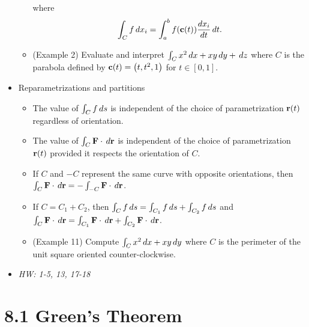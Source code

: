 \documentclass[11pt]{article}
\begin{document}
\begin{itemize}
\begin{itemize}
\[            \]
            where
            \[
              \int_C f\,d x_i
                =
              \int_a^b f(\mathbf{c}(t))\frac{dx_i}{dt}\,d t
            .\]
      \item (Example 2) Evaluate and interpret
            \(\int_C x^2\,d x+xy\,d y+\,d z\) where \(C\) is the
            parabola defined
            by \(\mathbf{c}(t)=\left(t,t^2,1\right)\) for \(t\in[0,1]\).
    \end{itemize}
  \item Reparametrizations and partitions
    \begin{itemize}
      \item The value of \(\int_C f\,d s\)
            is independent of the choice of parametrization \(\mathbf{r}(t)\)
            regardless of orientation.
      \item The value of \(\int_C \mathbf{F}\cdot\,d \mathbf{r}\)
            is independent of the choice of parametrization \(\mathbf{r}(t)\)
            provided it respects the orientation of \(C\).
      \item If \(C\) and \(-C\) represent the same curve with opposite
            orientations, then
            \(\int_C \mathbf{F}\cdot\,d\mathbf{r}=-\int_{-C}\mathbf{F}\cdot\,d\mathbf{r}\).
      \item If \(C=C_1+C_2\), then
            \(\int_C f\,d s=\int_{C_1}f\,d s+\int_{C_2}f\,d s\) and
            \(
              \int_C \mathbf{F}\cdot\,d \mathbf{r}
                =
              \int_{C_1}\mathbf{F}\cdot\,d \mathbf{r}+\int_{C_2}\mathbf{F}\cdot\,d \mathbf{r}
            \).
      \item (Example 11) Compute \(\int_C x^2\,d x+xy\,d y\) where
            \(C\) is the perimeter of the unit square oriented counter-clockwise.
    \end{itemize}
  \item\textit{
    HW: 1-5, 13, 17-18
  }
\end{itemize}



\section*{8.1 Green's Theorem}
\end{document}

